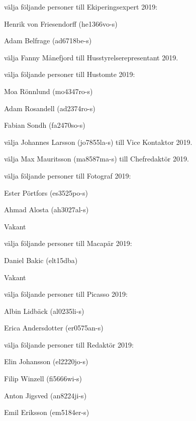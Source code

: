 \documentclass[10pt]{article}
\begin{document}
\begin{paragrafer}
\begin{paralist}
    \Mba välja följande personer till Ekiperingsexpert 2019:
    \begin{tightdashlist}
        \item Henrik von Friesendorff (he1366vo-s)
        \item Adam Belfrage (ad6718be-s)
    \end{tightdashlist}

    \Mba välja Fanny Månefjord till Husstyrelserepresentant 2019.

    \Mba välja följande personer till Hustomte 2019:
    \begin{tightdashlist}
        \item Moa Rönnlund (mo4347ro-s)
        \item Adam Rosandell (ad2374ro-s)
        \item Fabian Sondh (fa2470so-s)
    \end{tightdashlist}

    \Mba välja Johannes Larsson (jo7855la-s) till Vice Kontaktor 2019.

    \Mba välja Max Mauritsson (ma8587ma-s) till Chefredaktör 2019.

    \Mba välja följande personer till Fotograf 2019:
    \begin{tightdashlist}
        \item Ester Pörtfors (es3525po-s)
        \item Ahmad Alosta (ah3027al-s)
        \item Vakant
    \end{tightdashlist}

    \Mba välja följande personer till Macapär 2019:
    \begin{tightdashlist}
        \item Daniel Bakic (elt15dba)
        \item Vakant
    \end{tightdashlist}

    \Mba välja följande personer till Picasso 2019:
    \begin{tightdashlist}
        \item Albin Lidbäck (al0235li-s)
        \item Erica Andersdotter (er0575an-s)
    \end{tightdashlist}

    \Mba välja följande personer till Redaktör 2019:
    \begin{tightdashlist}
        \item Elin Johansson (el2220jo-s)
        \item Filip Winzell (fi5666wi-s)
        \item Anton Jigsved (an8224ji-s)
        \item Emil Eriksson (em5184er-s)
    \end{tightdashlist}


\end{paralist}
\end{paragrafer}
\end{document}
